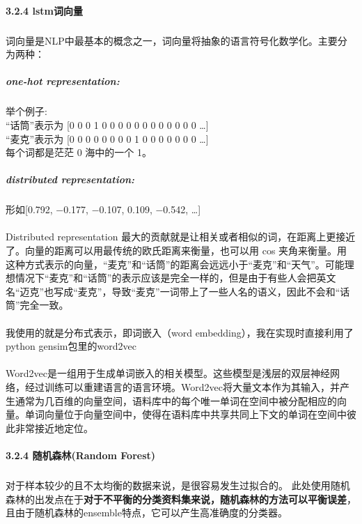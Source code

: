 \documentclass[UTF8]{article}
\begin{document}
\paragraph{\large 3.2.4 lstm词向量}
 \subparagraph{}词向量是NLP中最基本的概念之一，词向量将抽象的语言符号化数学化。主要分为两种：
 \subparagraph{one-hot representation:\\}


    举个例子:\\
    “话筒”表示为 [0 0 0 1 0 0 0 0 0 0 0 0 0 0 0 0 …]\\
    “麦克”表示为 [0 0 0 0 0 0 0 0 1 0 0 0 0 0 0 0 …]\\
    每个词都是茫茫 0 海中的一个 1。 \\



   \subparagraph{distributed  representation:\\}
    形如[0.792, −0.177, −0.107, 0.109, −0.542, …]\\
  \paragraph{}Distributed representation 最大的贡献就是让相关或者相似的词，在距离上更接近了。向量的距离可以用最传统的欧氏距离来衡量，也可以用 cos 夹角来衡量。用这种方式表示的向量，“麦克”和“话筒”的距离会远远小于“麦克”和“天气”。可能理想情况下“麦克”和“话筒”的表示应该是完全一样的，但是由于有些人会把英文名“迈克”也写成“麦克”，导致“麦克”一词带上了一些人名的语义，因此不会和“话筒”完全一致。

   \paragraph{}我使用的就是分布式表示，即词嵌入（word embedding），我在实现时直接利用了python gensim包里的word2vec \newline
   \paragraph{}Word2vec是一组用于生成单词嵌入的相关模型。这些模型是浅层的双层神经网络，经过训练可以重建语言的语言环境。Word2vec将大量文本作为其输入，并产生通常为几百维的向量空间，语料库中的每个唯一单词在空间中被分配相应的向量。单词向量位于向量空间中，使得在语料库中共享共同上下文的单词在空间中彼此非常接近地定位。\\




 \paragraph{\large 3.2.4 随机森林(Random Forest)}
 \subparagraph{}对于样本较少的且不太均衡的数据来说，是很容易发生过拟合的。
此处使用随机森林的出发点在于\textbf{对于不平衡的分类资料集来说，随机森林的方法可以平衡误差}，且由于随机森林的ensemble特点，它可以产生高准确度的分类器。
\end{document}
